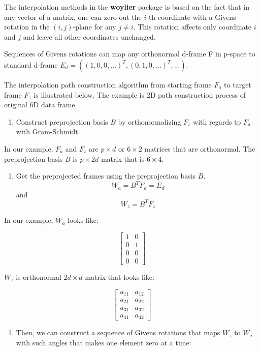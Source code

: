 The interpolation methods in the \textbf{woylier} package is based on
the fact that in any vector of a matrix, one can zero out the \(i\)-th
coordinate with a Givens rotation in the \((i, j)\)-plane for any
\(j\neq i\). This rotation affects only coordinate \(i\) and \(j\) and
leave all other coordinates unchanged.

Sequences of Givens rotations can map any orthonormal d-frame F in
p-space to standard d-frame
\(E_d=((1, 0, 0, ...)^T, (0, 1, 0, ...)^T, ...)\).

The interpolation path construction algorithm from starting frame
\(F_a\) to target frame \(F_z\) is illustrated below. The example is 2D
path construction process of original 6D data frame.

\begin{enumerate}
\def\labelenumi{\arabic{enumi}.}
\tightlist
\item
  Construct preprojection basis \(B\) by orthonormalizing \(F_z\) with
  regards tp \(F_a\) with Gram-Schmidt.
\end{enumerate}

In our example, \(F_a\) and \(F_z\) are \(p\times d\) or \(6\times2\)
matrices that are orthonormal. The preprojection basis \(B\) is
\(p\times 2d\) matrix that is \(6\times 4\).

\begin{enumerate}
\def\labelenumi{\arabic{enumi}.}
\setcounter{enumi}{1}
\tightlist
\item
  Get the preprojected frames using the preprojection basis \(B\).
  \[W_a = B^TF_a = E_d\] and \[W_z = B^TF_z\]
\end{enumerate}

In our example, \(W_a\) looks like:

\[ \begin{bmatrix}1 & 0 \\0  &1 \\ 0&0 \\0&0\end{bmatrix} \]

\(W_z\) is orthonormal \(2d\times d\) matrix that looks like:

\[ \begin{bmatrix} a_{11} & a_{12} \\a_{21}  &a_{22} \\ a_{31}&a_{32} \\a_{41}&a_{42}\end{bmatrix} \]

\begin{enumerate}
\def\labelenumi{\arabic{enumi}.}
\setcounter{enumi}{2}
\tightlist
\item
  Then, we can construct a sequence of Givens rotations that maps
  \(W_z\) to \(W_a\) with such angles that makes one element zero at a
  time:
\end{enumerate}

